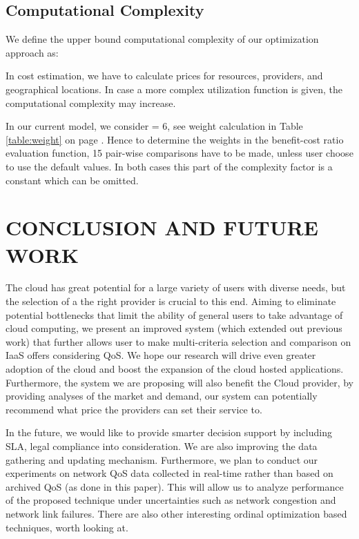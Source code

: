 \documentclass[journal]{IEEEtran}
\begin{document}
\subsection{Computational Complexity}

We define the upper bound computational complexity of our optimization approach as:


In cost estimation, we have to calculate prices for  resources,  providers, and  geographical locations. In case a more complex utilization function is given, the computational complexity may increase.

In our current model, we consider = 6, see weight calculation in Table \ref{table:weight} on page \pageref{table:weight}. Hence to determine the weights in the benefit-cost ratio evaluation function, 15 pair-wise comparisons have to be made, unless user choose to use the default values. In both cases this part of the complexity factor is a constant which can be omitted.

 



\section{CONCLUSION AND FUTURE WORK}\label{conclusion}

The cloud has great potential for a large variety of users with diverse needs, but the selection of a the right provider is crucial to this end. Aiming to eliminate potential bottlenecks that limit the ability of general users to take advantage of cloud computing, we present an improved system (which extended out previous work) that further allows user to make multi-criteria selection and comparison on IaaS offers considering QoS. We hope our research will drive even greater adoption of the cloud and boost the expansion of the cloud hosted applications. Furthermore, the system we are proposing will also benefit the Cloud provider, by providing analyses of the market and demand, our system can potentially recommend what price the providers can set their service to.


In the future, we would like to provide smarter decision support by including SLA, legal compliance    \cite{mouratidis2013framework} into consideration. We are also improving the data gathering and updating mechanism. Furthermore, we plan to conduct our experiments on network QoS data collected in real-time rather than based on archived QoS (as done in this paper). This will allow us to analyze performance of the proposed technique under uncertainties such as network congestion and network link failures. There are also other interesting ordinal optimization based techniques\cite{OOZhang2014}, \cite{MOSZhang2014309} worth looking at.
 
\end{document}
